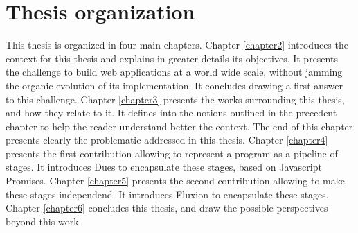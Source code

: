 \section{Thesis organization}

This thesis is organized in four main chapters.
Chapter \ref{chapter2} introduces the context for this thesis and explains in greater details its objectives.
It presents the challenge to build web applications at a world wide scale, without jamming the organic evolution of its implementation.
It concludes drawing a first answer to this challenge.
Chapter \ref{chapter3} presents the works surrounding this thesis, and how they relate to it.
It defines into the notions outlined in the precedent chapter to help the reader understand better the context.
The end of this chapter presents clearly the problematic addressed in this thesis.
Chapter \ref{chapter4} presents the first contribution allowing to represent a program as a pipeline of stages.
It introduces Dues to encapsulate these stages, based on Javascript Promises.
Chapter \ref{chapter5} presents the second contribution allowing to make these stages independend.
It introduces Fluxion to encapsulate these stages.
Chapter \ref{chapter6} concludes this thesis, and draw the possible perspectives beyond this work.
